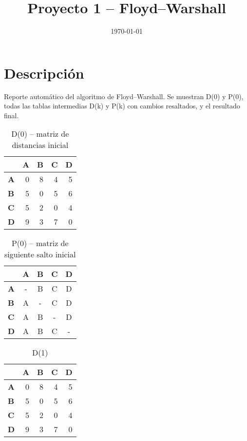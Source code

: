 \documentclass[11pt]{article}
\title{Proyecto 1 – Floyd–Warshall}
\date{\today}
\begin{document}
\maketitle
\section*{Descripción}
Reporte automático del algoritmo de Floyd–Warshall. Se muestran D(0) y P(0), todas las tablas intermedias D(k) y P(k) con cambios resaltados, y el resultado final.

\begin{table}[H]\centering
\caption{D(0) – matriz de distancias inicial}
\begin{tabular}{l r r r r}
\toprule
 & \textbf{A} & \textbf{B} & \textbf{C} & \textbf{D}\\\midrule
\textbf{A} & 0 & 8 & 4 & 5 \\
\textbf{B} & 5 & 0 & 5 & 6 \\
\textbf{C} & 5 & 2 & 0 & 4 \\
\textbf{D} & 9 & 3 & 7 & 0 \\
\bottomrule
\end{tabular}
\end{table}

\begin{table}[H]\centering
\caption{P(0) – matriz de siguiente salto inicial}
\begin{tabular}{l c c c c}
\toprule
 & \textbf{A} & \textbf{B} & \textbf{C} & \textbf{D}\\\midrule
\textbf{A} & - & B & C & D \\
\textbf{B} & A & - & C & D \\
\textbf{C} & A & B & - & D \\
\textbf{D} & A & B & C & - \\
\bottomrule
\end{tabular}
\end{table}

\begin{table}[H]\centering
\caption{D(1)}
\begin{tabular}{l r r r r}
\toprule
 & \textbf{A} & \textbf{B} & \textbf{C} & \textbf{D}\\\midrule
\textbf{A} & 0 & 8 & 4 & 5 \\
\textbf{B} & 5 & 0 & 5 & 6 \\
\textbf{C} & 5 & 2 & 0 & 4 \\
\textbf{D} & 9 & 3 & 7 & 0 \\
\bottomrule
\end{tabular}
\end{table}
\end{document}
